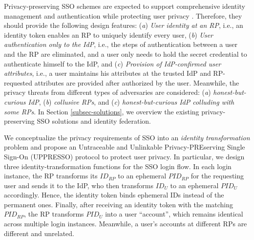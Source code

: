 Privacy-preserving SSO schemes are expected to support comprehensive identity management and authentication while protecting user privacy \cite{maler2008venn,NIST2017draft,BrowserID,SPRESSO}.
Therefore, they should provide the following design features:
(\emph{a}) \emph{User identity at an RP},
    i.e., an identity token enables an RP to uniquely identify every user,
(\emph{b}) \emph{User authentication only to the IdP}, i.e.,
    the steps of authentication between a user and the RP are eliminated,
    and a user only needs to hold the secret credential to authenticate himself to the IdP,
and (\emph{c}) \emph{Provision of IdP-confirmed user attributes}, i.e., a user maintains his attributes at the trusted IdP and RP-requested attributes are provided %
after authorized by the user.
Meanwhile, the privacy threats from different types of adversaries are considered: (\emph{a}) \emph{honest-but-curious IdP}, (\emph{b}) \emph{collusive RPs}, and (\emph{c}) \emph{honest-but-curious IdP colluding with some RPs}.
In Section \ref{subsec-solutions}, we overview the existing privacy-preserving SSO solutions and identity federation.



We conceptualize the privacy requirements of SSO into
  an {\em identity transformation} problem %
and propose an Untraceable and Unlinkable Privacy-PREserving Single Sign-On (UPPRESSO) protocol to protect user privacy.
In particular, we design three identity-transformation functions for the SSO login flow.
In each login instance, the RP transforms its $ID_{RP}$ to an ephemeral $PID_{RP}$ for the requesting user and sends it to the IdP, who then transforms $ID_U$ to an ephemeral $PID_U$ accordingly. Hence, the identity token binds ephemeral IDs %
instead of the permanent ones. %
Finally, after receiving an identity token with the matching $PID_{RP}$, the RP transforms $PID_U$ into a user ``account'', which remains identical across multiple login instances. Meanwhile, a user's accounts at different RPs are different and unrelated.

